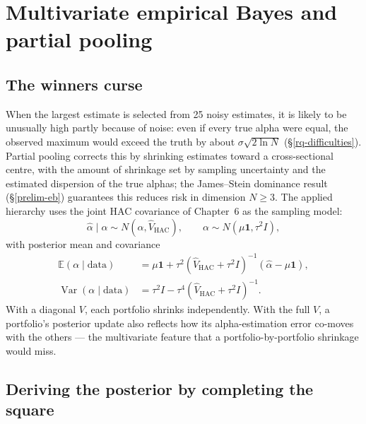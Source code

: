 \hypertarget{bayes}{}
\hypertarget{multivariate-empirical-bayes-and-partial-pooling}{%
\chapter{Multivariate empirical Bayes and partial
pooling}\label{multivariate-empirical-bayes-and-partial-pooling}}

\hypertarget{the-winners-curse}{%
\section{The winner\textquotesingle s curse}\label{the-winners-curse}}

When the largest estimate is selected from 25 noisy estimates, it is
likely to be unusually high partly because of noise: even if every true
alpha were equal, the observed maximum would exceed the truth by about
$\sigma\sqrt{2\ln N}$ (\S\ref{rq-difficulties}). Partial pooling corrects
this by shrinking estimates toward a cross-sectional centre, with the amount
of shrinkage set by sampling uncertainty and the estimated dispersion of the
true alphas; the James--Stein dominance result (\S\ref{prelim-eb})
guarantees this reduces risk in dimension $N\ge3$. The applied hierarchy
uses the joint HAC covariance of Chapter~6 as the sampling model:
\begin{equation}\label{eq:ch8-hierarchy}
\hat\alpha\mid\alpha \sim N(\alpha,\hat V_{\mathrm{HAC}}),
\qquad \alpha \sim N(\mu\mathbf{1},\tau^2 I),
\end{equation}
with posterior mean and covariance
\begin{align}
\mathbb{E}(\alpha\mid\text{data})
&= \mu\mathbf{1} + \tau^2(\hat V_{\mathrm{HAC}}+\tau^2 I)^{-1}(\hat\alpha-\mu\mathbf{1}),
\label{eq:ch8-postmean}\\
\operatorname{Var}(\alpha\mid\text{data})
&= \tau^2 I - \tau^4(\hat V_{\mathrm{HAC}}+\tau^2 I)^{-1}.
\label{eq:ch8-postvar}
\end{align}
With a diagonal $V$, each portfolio shrinks independently. With the full
$V$, a portfolio's posterior update also reflects how its alpha-estimation
error co-moves with the others --- the multivariate feature that a
portfolio-by-portfolio shrinkage would miss.

\hypertarget{deriving-the-posterior-by-completing-the-square}{%
\section{Deriving the posterior by completing the
square}\label{deriving-the-posterior-by-completing-the-square}}

